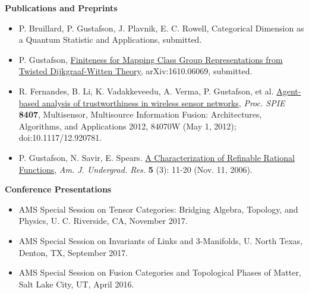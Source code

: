 \documentclass[11pt]{article}
\begin{document}
  {\large \textbf{Publications and Preprints}}

  \begin{itemize}
    
  \item[]P. Bruillard, P. Gustafson, J. Plavnik, E. C. Rowell, Categorical Dimension as a Quantum Statistic and Applications, submitted. 
    
  \item[] P. Gustafson, \href{https://arxiv.org/abs/1610.06069}{Finiteness for Mapping Class Group Representations from Twisted Dijkgraaf-Witten Theory}, arXiv:1610.06069, submitted.

  \item[] R. Fernandes, B. Li, K. Vadakkeveedu, A. Verma, P. Gustafson, et al. \href{http://proceedings.spiedigitallibrary.org/proceeding.aspx?articleid=1354959}{Agent-based analysis of trustworthiness in wireless sensor networks}, \emph{Proc. SPIE} \textbf{8407}, Multisensor, Multisource Information Fusion: Architectures, Algorithms, and Applications 2012, 84070W (May 1, 2012); doi:10.1117/12.920781. 

 \item[] P. Gustafson, N. Savir, E. Spears. \href{http://www.uni.edu/ajur/v5n3/Gufstafson\%20et\%20al\%20new\%20pp\%2011-20.pdf}{A Characterization of Refinable Rational Functions}, \emph{Am. J. Undergrad. Res.} \textbf{5} (3): 11-20 (Nov. 11, 2006).
  
 \end{itemize}


  {\large \textbf{Conference Presentations}}

  \begin{itemize}
    \item[] AMS Special Session on Tensor Categories: Bridging Algebra, Topology, and Physics, U. C.
Riverside, CA, November 2017.

    \item[] AMS Special Session on Invariants of Links and 3-Manifolds, U. North Texas, Denton,
TX, September 2017.

    \item[] AMS Special Session on Fusion Categories and Topological Phases of Matter, Salt Lake City,
UT, April 2016.
  \end{itemize}
  
\end{document}
